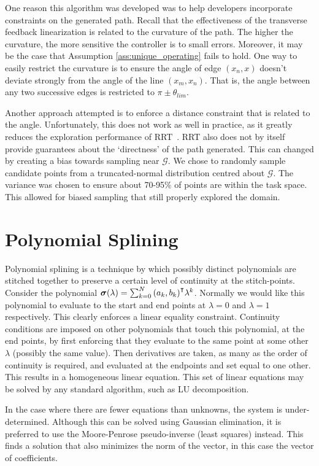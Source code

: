 One reason this algorithm was developed was to help developers incorporate constraints on the generated path. Recall that the effectiveness of the transverse feedback linearization is related to the curvature of the path. The higher the curvature, the more sensitive the controller is to small errors. Moreover, it may be the case that Assumption \ref{ass:unique_operating} fails to hold. One way to easily restrict the curvature is to ensure the angle of edge $(x_n, x)$ doesn't deviate strongly from the angle of the line $(x_m, x_n)$. That is, the angle between any two successive edges is restricted to $\pi\pm\theta_{lim}$.

Another approach attempted is to enforce a distance constraint that is related to the angle. Unfortunately, this does not work as well in practice, as it greatly reduces the exploration performance of RRT~\cite{Yang14}. RRT also does not by itself provide guarantees about the `directness' of the path generated. This can changed by creating a bias towards sampling near $\mathcal{G}$\cite{LaValle06}\cite{Yang14}. We chose to randomly sample candidate points from a truncated-normal distribution centred about $\mathcal{G}$. The variance was chosen to ensure about 70-95\% of points are within the task space. This allowed for biased sampling that still properly explored the domain.

\section{Polynomial Splining}
Polynomial splining is a technique by which possibly distinct polynomials are stitched together to preserve a certain level of continuity at the stitch-points. Consider the polynomial $\bm{\sigma}(\lambda) = \sum_{k=0}^N{{(a_{k},b_{k})}^{\intercal}\lambda^k}$. Normally we would like this polynomial to evaluate to the start and end points at $\lambda=0$ and $\lambda=1$ respectively. This clearly enforces a linear equality constraint. Continuity conditions are imposed on other polynomials that touch this polynomial, at the end points, by first enforcing that they evaluate to the same point at some other $\lambda$ (possibly the same value). Then derivatives are taken, as many as the order of continuity is required, and evaluated at the endpoints and set equal to one other. This results in a homogeneous linear equation. This set of linear equations may be solved by any standard algorithm, such as LU decomposition.

In the case where there are fewer equations than unknowns, the system is under-determined. Although this can be solved using Gaussian elimination, it is preferred to use the Moore-Penrose pseudo-inverse (least squares) instead. This finds a solution that also minimizes the norm of the vector, in this case the vector of coefficients.

